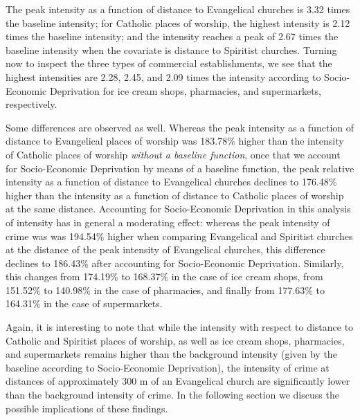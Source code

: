 \documentclass[smallextended]{svjour3}       %
\begin{document}
The peak intensity as a function of distance to Evangelical churches is
3.32 times the baseline intensity; for Catholic places of worship, the
highest intensity is 2.12 times the baseline intensity; and the
intensity reaches a peak of 2.67 times the baseline intensity when the
covariate is distance to Spiritist churches. Turning now to inspect the
three types of commercial establishments, we see that the highest
intensities are 2.28, 2.45, and 2.09 times the intensity according to
Socio-Economic Deprivation for ice cream shops, pharmacies, and
supermarkets, respectively.

Some differences are observed as well. Whereas the peak intensity as a
function of distance to Evangelical places of worship was 183.78\%
higher than the intensity of Catholic places of worship \emph{without a
baseline function}, once that we account for Socio-Economic Deprivation
by means of a baseline function, the peak relative intensity as a
function of distance to Evangelical churches declines to 176.48\% higher
than the intensity as a function of distance to Catholic places of
worship at the same distance. Accounting for Socio-Economic Deprivation
in this analysis of intensity has in general a moderating effect:
whereas the peak intensity of crime was was 194.54\% higher when
comparing Evangelical and Spiritist churches at the distance of the peak
intensity of Evangelical churches, this difference declines to 186.43\%
after accounting for Socio-Economic Deprivation. Similarly, this changes
from 174.19\% to 168.37\% in the case of ice cream shops, from 151.52\%
to 140.98\% in the case of pharmacies, and finally from 177.63\% to
164.31\% in the case of supermarkets.

Again, it is interesting to note that while the intensity with respect
to distance to Catholic and Spiritist places of worship, as well as ice
cream shops, pharmacies, and supermarkets remains higher than the
background intensity (given by the baseline according to Socio-Economic
Deprivation), the intensity of crime at distances of approximately 300 m
of an Evangelical church are significantly lower than the background
intensity of crime. In the following section we discuss the possible
implications of these findings.
\end{document}
